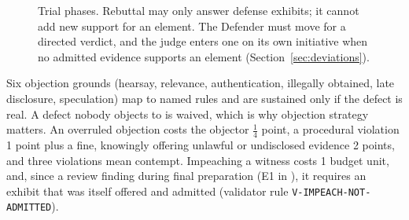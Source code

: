 \begin{figure}[ht]\centering
{}
\caption{Trial phases. Rebuttal may only answer defense exhibits; it cannot add new support for an element. The Defender must move for a directed verdict, and the judge enters one on its own initiative when no admitted evidence supports an element (Section~\ref{sec:deviations}).}\label{fig:phases}
\end{figure}

Six objection grounds (hearsay, relevance, authentication, illegally obtained, late disclosure, speculation) map to named rules and are sustained only if the defect is real. A defect nobody objects to is waived, which is why objection strategy matters. An overruled objection costs the objector \(\tfrac14\) point, a procedural violation 1 point plus a fine, knowingly offering unlawful or undisclosed evidence 2 points, and three violations mean contempt. Impeaching a witness costs 1 budget unit, and, since a review finding during final preparation (E1 in ), it requires an exhibit that was itself offered and admitted (validator rule \texttt{V-IMPEACH-NOT-ADMITTED}).

